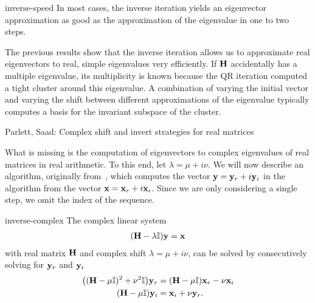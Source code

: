 \begin{Corollary}{inverse-speed}
  In most cases, the inverse iteration yields an eigenvector
  approximation as good as the approximation of the eigenvalue in one
  to two steps.
\end{Corollary}

\begin{remark}
  The previous results show that the inverse iteration allows us to
  approximate real eigenvectors to real, simple eigenvalues very
  efficiently. If $\mathbf H$ accidentally has a multiple eigenvalue, its
  multiplicity is known because the QR iteration computed a tight
  cluster around this eigenvalue. A combination of varying the initial
  vector and varying the shift between different approximations of the
  eigenvalue typically computes a basis for the invariant subspace of
  the cluster.
\end{remark}

\begin{todo}
  Parlett, Saad: Complex shift and invert strategies for real matrices
\end{todo}

\begin{intro}
  What is missing is the computation of eigenvectors to complex
  eigenvalues of real matrices in real arithmetic. To this end, let
  $\lambda = \mu+i\nu$. We will now describe an algorithm, originally
  from~\cite{ParlettSaad87}, which computes the vector
  $\mathbf y = \mathbf y_r + i \mathbf y_i$ in the algorithm from the vector
  $\mathbf x = \mathbf x_r+i\mathbf x_i$. Since we are only considering a single step,
  we omit the index of the sequence.
\end{intro}

\begin{Lemma}{inverse-complex}
  The complex linear system
  \begin{gather}
    \label{eq:inverse:1}
    (\mathbf H - \lambda\mathbb I) \mathbf y = \mathbf x
  \end{gather}
  with real matrix $\mathbf H$ and complex shift $\lambda = \mu+i\nu$, can
  be solved by consecutively solving for $\mathbf y_r$ and $\mathbf y_i$
  \begin{align}
    \bigl((\mathbf H-\mu\mathbb I)^2+\nu^2\mathbb I\bigr) \mathbf y_r
    &= (\mathbf H-\mu\mathbb I) \mathbf x_r - \nu \mathbf x_i\\
    (\mathbf H-\mu\mathbb I) \mathbf y_i &= \mathbf x_i + \nu\mathbf y_r.
  \end{align}
\end{Lemma}


